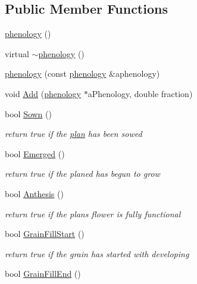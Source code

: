 \subsection*{Public Member Functions}
\begin{DoxyCompactItemize}
\item 
\hyperlink{classphenology_a1694ce5b60300e31f802d56359a24bdd}{phenology} ()
\item 
virtual \hyperlink{classphenology_a263df25145508d60fb2a5e8e401d895e}{$\sim$phenology} ()
\item 
\hyperlink{classphenology_a6f0636f83d10f27a541221c58edcce57}{phenology} (const \hyperlink{classphenology}{phenology} \&aphenology)
\item 
void \hyperlink{classphenology_ad33769d1f209f2cccb78c26d4127161e}{Add} (\hyperlink{classphenology}{phenology} $\ast$aPhenology, double fraction)
\item 
bool \hyperlink{classphenology_aa4986dd79d0fc195c3f1c21833171906}{Sown} ()
\begin{DoxyCompactList}\small\item\em return true if the \hyperlink{classplan}{plan} has been sowed \item\end{DoxyCompactList}\item 
bool \hyperlink{classphenology_a514ca53b35d3dfc3e8dc1b4841d221cf}{Emerged} ()
\begin{DoxyCompactList}\small\item\em return true if the planed has begun to grow \item\end{DoxyCompactList}\item 
bool \hyperlink{classphenology_a9f571608ca2e2eaf7d1a79715afa8e0c}{Anthesis} ()
\begin{DoxyCompactList}\small\item\em return true if the plans flower is fully functional \item\end{DoxyCompactList}\item 
bool \hyperlink{classphenology_a8cae850ebecaff9242a27d529ab72e09}{GrainFillStart} ()
\begin{DoxyCompactList}\small\item\em return true if the grain has started with developing \item\end{DoxyCompactList}\item 
bool \hyperlink{classphenology_aa2966766123b0b7b2d948fd74ecd057b}{GrainFillEnd} ()

\end{DoxyCompactItemize}
